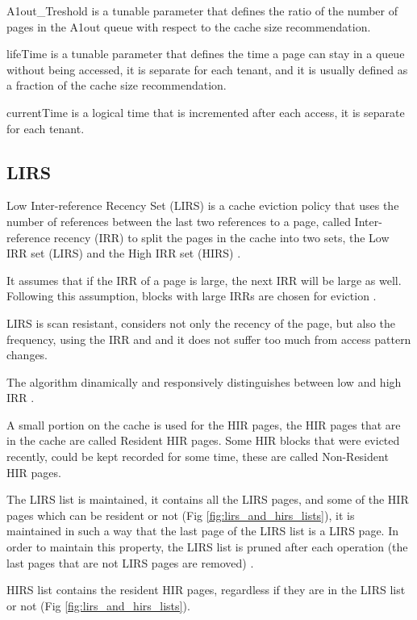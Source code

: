 A1out\_Treshold is a tunable parameter that defines the ratio of the number of pages in the A1out
queue with respect to the cache size recommendation.

lifeTime is a tunable parameter that defines the time a page can stay in a queue without being accessed,
it is separate for each tenant, and it is usually defined as a fraction of the cache size recommendation.

currentTime is a logical time that is incremented after each access, it is separate for each tenant.

\subsection{LIRS}

Low Inter-reference Recency Set (LIRS) is a cache eviction policy that uses the number 
of references between the last two references to a page, called Inter-reference recency
(IRR) to split the pages in the cache into two sets, the Low IRR set (LIRS) and the 
High IRR set (HIRS) \cite{lirs-article}.

It assumes that if the IRR of a page is large, the next IRR will be large as well. Following
this assumption, blocks with large IRRs are chosen for eviction \cite{lirs-article}.

LIRS is scan resistant, considers not only the recency of the page, but also the
frequency, using the IRR and and it does not suffer too much from access pattern changes.

The algorithm dinamically and responsively distinguishes between low and high IRR \cite{lirs-article}.

A small portion on the cache is used for the HIR pages, the HIR pages that are in the cache
are called Resident HIR pages. Some HIR blocks that were evicted recently, could be kept 
recorded for some time, these are called Non-Resident HIR pages.

The LIRS list is maintained, it contains all the LIRS pages, and some of the HIR pages 
which can be resident or not (Fig \ref{fig:lirs_and_hirs_lists}), it is maintained in such a 
way that the last page of the LIRS list is a LIRS page. In order to maintain this property,
the LIRS list is pruned after each operation (the last pages that are not LIRS pages are removed)
\cite{lirs-article}.

HIRS list contains the resident HIR pages, regardless if they are in the LIRS list or not 
(Fig \ref{fig:lirs_and_hirs_lists}).


